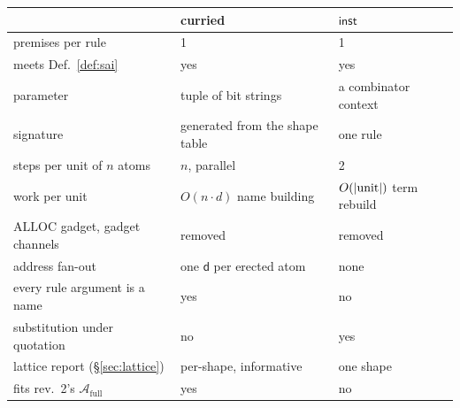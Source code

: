 \documentclass[11pt,a4paper]{article}
\newcommand{\dd}{\mathsf{d}}
\newcommand{\Atm}{\mathcal{A}}
\newcommand{\ALLOC}{\mathrm{ALLOC}}
\newcommand{\inst}{\mathsf{inst}}
\theoremstyle{definition}
\theoremstyle{plain}
\begin{document}
\begin{center}
\footnotesize
\begin{tabular}{@{}lll@{}}
\toprule
 & curried & $\inst$\\
\midrule
premises per rule & 1 & 1\\
meets Def.~\ref{def:sai} & yes & yes\\
parameter & tuple of bit strings & a combinator context\\
signature & generated from the shape table & one rule\\
steps per unit of $n$ atoms & $n$, parallel & 2\\
work per unit & $O(n\cdot d)$ name building & $O(|{\rm unit}|)$ term rebuild\\
$\ALLOC$ gadget, gadget channels & removed & removed\\
address fan-out & one $\dd$ per erected atom & none\\
every rule argument is a name & yes & no\\
substitution under quotation & no & yes\\
lattice report (\S\ref{sec:lattice}) & per-shape, informative & one shape\\
fits \cite{logic} rev.~2's $\Atm_{\mathrm{full}}$ & yes & no\\
\bottomrule
\end{tabular}
\end{center}
\end{document}
